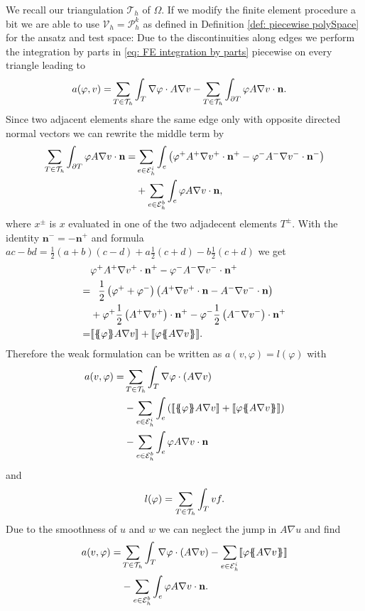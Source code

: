 We recall our triangulation $\mathcal{T}_h$ of $\Omega$. If we modify the finite element procedure a bit we are able to use $\mathcal V_h = \mathcal P_h^k$ as defined in Definition \ref*{def: piecewise polySpace} for the ansatz and test space: Due to the discontinuities along edges we perform the integration by parts in \eqref{eq: FE integration by parts} piecewise on every triangle leading to
\begin{align}
	a(\varphi, v) = & \sum_{T \in \mathcal{T}_h} \int_T \nabla \varphi \cdot A \nabla v - \sum_{T \in \mathcal{T}_h} \int_{\partial T} \varphi A \nabla v \cdot \mathbf n.
\end{align}
Since two adjacent elements share the same edge only with opposite directed normal vectors we can rewrite the middle term by
\begin{align*}
\sum\limits_{T \in \mathcal{T}_h}\int_{\partial T} \varphi A \nabla v \cdot \mathbf n 
= &\sum\limits_{e \in \mathcal{E}_h^i}\int_{e} \left( \varphi^+ A^+ \nabla v^+ \cdot \mathbf n^+ - \varphi^- A^- \nabla v^- \cdot \mathbf n^- \right) \\
& + \sum\limits_{e \in \mathcal{E}_h^b}\int_{e} \varphi A \nabla v \cdot \mathbf n,
\end{align*}
where $x^\pm $ is $x$ evaluated in one of the two adjadecent elements $T^\pm$. With the identity $\mathbf n^- = -\mathbf n^+$ and formula $ac-bd = \frac 1 2 (a+b)(c-d) + a\frac 1 2(c+d)-b\frac 1 2(c+d)$  we get
\begin{align*}
	&\varphi^+ A^+ \nabla v^+ \cdot \mathbf n^+ - \varphi^- A^- \nabla v^- \cdot \mathbf n^+ \\
	= & \phantom{+} \frac 1 2 \left(\varphi^+ + \varphi^- \right) \left(A^+ \nabla v^+ \cdot \mathbf n - A^- \nabla v^- \cdot \mathbf n \right) \\
  &+  \varphi^+ \frac 1 2  \left(A^+ \nabla v^+\right) \cdot \mathbf n^+ - \varphi^- \frac 1 2 \left(A^- \nabla v^-\right) \cdot \mathbf n^+ \\
  = &  \jump {\average \varphi  A \nabla v}+ \jump {\varphi \average{ A \nabla v}}.
\end{align*}
Therefore the weak formulation can be written as $a(v,\varphi) = l(\varphi)$ with 
\begin{align*}
  a(v, \varphi) = & \sum\limits_{T \in \triang} \int_T \nabla \varphi \cdot \left(A \nabla v\right) \\
	& - \sum\limits_{e \in \edgesi}\int_{e} \left( \jump {\average \varphi A \nabla v} + \jump {\varphi \average{ A \nabla v}} \right)\\
& - \sum\limits_{e \in \edgesb}\int_{e} \varphi A \nabla v \cdot \mathbf n
\end{align*}
and
\[
l(\varphi) = \sum_{T \in \mathcal{T}_h} \int_T v f.
\]
Due to the smoothness of $u$ and $w$ we can neglect the jump in $A \nabla u$ and find
\begin{align*}
 a(v, \varphi) = & \sum\limits_{T \in \triang} \int_T \nabla \varphi \cdot \left(A \nabla v\right) %
	- \sum\limits_{e \in \edgesi}
	\jump{ \varphi \average{ A \nabla v}} %
	\\
& - \sum\limits_{e \in \edgesb}\int_{e} \varphi A \nabla v \cdot \mathbf n.
\end{align*}

